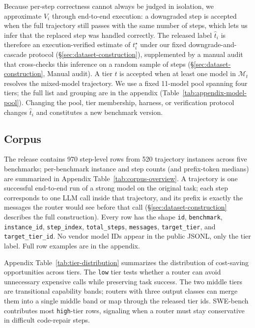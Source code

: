Because per-step correctness cannot always be judged in isolation, we
approximate $V_i$ through end-to-end execution: a downgraded step is
accepted when the full trajectory still passes with the same number of
steps, which lets us infer that the replaced step was handled correctly.
The released label $\hat{t}_i$ is therefore an execution-verified
estimate of $t_i^\star$ under our fixed downgrade-and-cascade protocol
(\S\ref{sec:dataset-construction}), supplemented by a manual audit
that cross-checks this inference on a random sample of steps
(\S\ref{sec:dataset-construction}, Manual audit). A tier $t$ is accepted
when at least one model in $\mathcal M_t$ resolves the mixed-model
trajectory. We use a fixed 11-model pool spanning four tiers; the full
list and grouping are in the appendix
(Table~\ref{tab:appendix-model-pool}). Changing the pool, tier
membership, harness, or verification protocol changes $\hat{t}_i$ and
constitutes a new benchmark version.

\subsection{Corpus}

The release contains 970 step-level rows from 520 trajectory instances across
five benchmarks; per-benchmark instance and step counts (and prefix-token
medians) are summarized in Appendix Table~\ref{tab:corpus-overview}. A trajectory is one
successful end-to-end run of a strong model on the original task; each step
corresponds to one LLM call inside that trajectory, and its prefix is exactly
the messages the router would see before that call
(\S\ref{sec:dataset-construction} describes the full construction). Every
row has the shape \texttt{id}, \texttt{benchmark}, \texttt{instance\_id},
\texttt{step\_index}, \texttt{total\_steps}, \texttt{messages},
\texttt{target\_tier}, and \texttt{target\_tier\_id}. No vendor model IDs
appear in the public JSONL, only the tier label. Full row examples are in
the appendix.

Appendix Table~\ref{tab:tier-distribution} summarizes the distribution of cost-saving
opportunities across tiers. The \texttt{low} tier tests whether a router can
avoid unnecessary expensive calls while preserving task success. The two middle
tiers are transitional capability bands; routers with three output classes can
merge them into a single middle band or map through the released tier ids.
SWE-bench contributes most \texttt{high}-tier rows, signaling when a router
must stay conservative in difficult code-repair steps.

